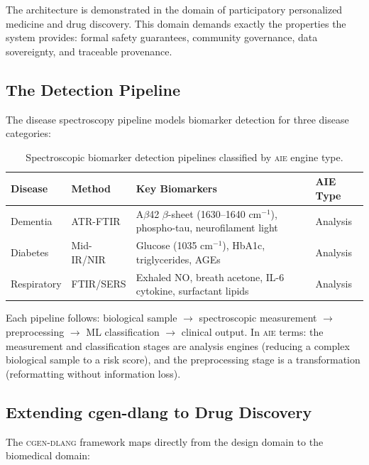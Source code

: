 \documentclass[11pt,letterpaper]{article}
\newcommand{\aie}{\textsc{aie}}
\newcommand{\cgen}{\textsc{cgen-dlang}}
\begin{document}
The architecture is demonstrated in the domain of participatory personalized medicine and drug discovery. This domain demands exactly the properties the system provides: formal safety guarantees, community governance, data sovereignty, and traceable provenance.

\subsection{The Detection Pipeline}

The disease spectroscopy pipeline models biomarker detection for three disease categories:

\begin{table}[H]
\centering
\small
\begin{tabularx}{\textwidth}{llXl}
\toprule
\textbf{Disease} & \textbf{Method} & \textbf{Key Biomarkers} & \textbf{AIE Type} \\
\midrule
Dementia & ATR-FTIR & A$\beta$42 $\beta$-sheet (1630--1640 cm$^{-1}$), phospho-tau, neurofilament light & Analysis \\
\addlinespace
Diabetes & Mid-IR/NIR & Glucose (1035 cm$^{-1}$), HbA1c, triglycerides, AGEs & Analysis \\
\addlinespace
Respiratory & FTIR/SERS & Exhaled NO, breath acetone, IL-6 cytokine, surfactant lipids & Analysis \\
\bottomrule
\end{tabularx}
\caption{Spectroscopic biomarker detection pipelines classified by \aie{} engine type.}
\label{tab:disease-pipelines}
\end{table}

Each pipeline follows: biological sample $\rightarrow$ spectroscopic measurement $\rightarrow$ preprocessing $\rightarrow$ ML classification $\rightarrow$ clinical output. In \aie{} terms: the measurement and classification stages are analysis engines (reducing a complex biological sample to a risk score), and the preprocessing stage is a transformation (reformatting without information loss).

\subsection{Extending cgen-dlang to Drug Discovery}

The \cgen{} framework maps directly from the design domain to the biomedical domain:
\end{document}
